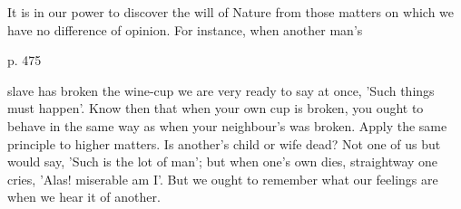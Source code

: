 It is in our  power to discover the will of Nature from  those matters on which
we have no difference of opinion. For instance, when another man's

p. 475

slave has broken  the wine-cup we are  very ready to say at  once, 'Such things
must happen'. Know then  that when your own cup is broken,  you ought to behave
in the same way  as when your neighbour's was broken.  Apply the same principle
to higher  matters. Is another's child  or wife dead?  Not one of us  but would
say, 'Such is the lot of man';  but when one's own dies, straightway one cries,
'Alas! miserable am I'. But we ought  to remember what our feelings are when we
hear it of another.
